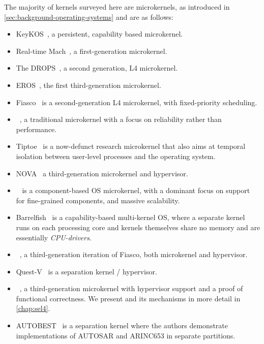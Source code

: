 The majority of kernels surveyed here are microkernels, as introduced in
\cref{sec:background-operating-systems} and are as follows: 

\begin{itemize}
    \item KeyKOS~\citep{Bomberger_FFHLS_92}, a persistent, capability based microkernel. 
    \item Real-time Mach~\citep{Mercer_RZ_94, Mercer_ST_93}, a first-generation microkernel.
    \item The \gls{DROPS}~\citep{Haertig_BBHHMRSW_98}, a second
        generation, L4 microkernel.
    \item EROS~\citep{Shapiro_SF_99}, the first third-generation microkernel.
    \item Fiasco~\citep{Hohmuth_02} is a second-generation L4 microkernel, with fixed-priority scheduling.
    \item \minix~\citep{Herder_BGHT_06}, a traditional microkernel with a focus on reliability
        rather than performance. 
    \item Tiptoe~\citep{Craciunas_KPRS_09} is a now-defunct research microkernel that also aims at
temporal isolation between user-level processes and the operating system.
    \item NOVA~\citep{Steinberg_Kauer_10} a third-generation microkernel and hypervisor.
    \item \composite~\citep{Parmer:phd} is a component-based \gls{OS} microkernel, with a dominant focus
        on support for fine-grained components, and massive scalability.
    \item Barrelfish~\citep{Peter_SBBIHR_10} is a capability-based multi-kernel \gls{OS}, where a separate kernel runs on each processing core and kernels themselves share no memory and are essentially \emph{\gls{CPU}-drivers}.
    \item \fiascooc~\citep{Lackorzynski_WVH_12}, a third-generation iteration of Fiasco, both microkernel and
        hypervisor.
    \item Quest-V~\citep{Danish_LW_11} is a separation kernel / hypervisor.
    \item \selfour~\citep{Klein_AEMSKH_14}, a third-generation microkernel with
        hypervisor support and a proof of functional correctness. We present \selfour 
        and its mechanisms in more detail in \cref{chap:sel4}.
    \item AUTOBEST~\citep{Zuepke_BL_15} is a separation kernel where the authors demonstrate implementations
           of AUTOSAR and ARINC653 in separate partitions.
\end{itemize}

